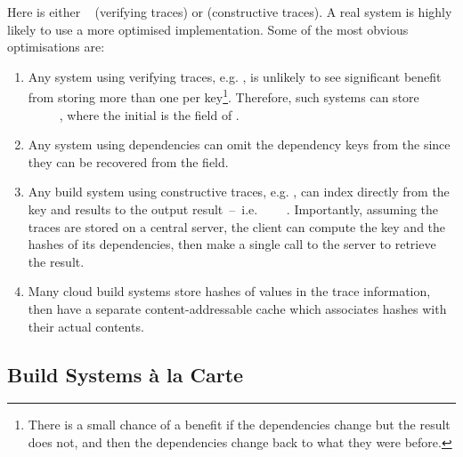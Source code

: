 \noindent
Here  is either ~ (verifying traces) or
 (constructive traces). A real system is highly likely to use a more
optimised implementation. Some of the most obvious optimisations are:

\begin{enumerate}
\item Any system using verifying traces, e.g. \Shake, is unlikely to see
significant benefit from storing more than one  per key\footnote{There
is a small chance of a benefit if the dependencies change but the result does
not, and then the dependencies change back to what they were before.}.
Therefore, such systems can store ~~~~~,
where the initial  is the  field of .

\item Any system using  dependencies can omit the dependency
keys from the  since they can be recovered from the  field.

\item Any  build system using constructive traces, e.g.
\Bazel, can index directly from the key and results to the output result~--~i.e.
~~\hs{[Hash}~\hs{v])}~. Importantly, assuming the traces
are stored on a central server, the client can compute the key and the hashes of
its dependencies, then make a single call to the server to retrieve the result.

\item Many cloud build systems store hashes of values in the trace information,
then have a separate content-addressable cache which associates hashes with
their actual contents.
\end{enumerate}

\subsection{Build Systems \`a la Carte}\label{sec-design-space}

